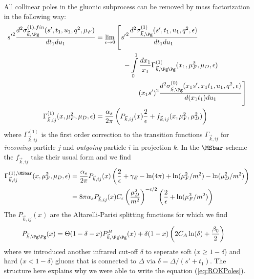 All collinear poles in the gluonic subprocess can be removed by mass factorization in the following way:
\begin{align}
{s'}^2\frac{d^2\sigma_{\vec k,\Pg}^{(1),fin}(s',t_1,u_1,q^2,\mu_F)}{dt_1du_1} &= \lim_{\epsilon\rightarrow 0}\left[{s'}^2\frac{d^2\sigma_{\vec k,\Pg}^{(1)}(s',t_1,u_1,q^2,\epsilon)}{dt_1du_1} \right.\nonumber\\
 &\hspace{40pt} -\int\limits_0^1\frac{dx_1}{x_1}\Gamma_{\vec k,\Pg\Pg}^{(1)}(x_1,\mu_F^2,\mu_D,\epsilon)\\
 &\hspace{60pt}\left.(x_1s')^2\frac{d^2\sigma_{\vec k,\Pg}^{(0)}(x_1s',x_1t_1,u_1,q^2,\epsilon)}{d(x_1t_1)du_1} \right]\\
\Gamma_{\vec k,ij}^{(1)}(x,\mu_F^2,\mu_D,\epsilon) &= \frac{\alpha_s}{2\pi}\left(P_{\vec k,ij}(x)\frac{2}{\epsilon} + f_{\vec k,ij}(x,\mu_F^2,\mu_D^2)\right)
\end{align}
where $\Gamma_{\vec k,ij}^{(1)}$ is the first order correction to the transition functions $\Gamma_{\vec k,ij}$ for \textit{incoming} particle $j$ and \textit{outgoing} particle $i$ in projection $k$. In the $\MSbar$-scheme the $f_{\vec k,ij}$ take their usual form and we find
\begin{align}
\Gamma_{\vec k,ij}^{(1),\MSbar}(x,\mu_F^2,\mu_D,\epsilon) &= \frac{\alpha_s}{2\pi}P_{\vec k,ij}(x)\left(\frac{2}{\epsilon} +\gamma_E - \ln(4\pi) + \ln(\mu_F^2/m^2) - \ln(\mu_D^2/m^2)\right)\\
 &= 8\pi\alpha_s P_{\vec k,ij}(x) C_\epsilon \left(\frac{\mu_D^2}{m^2}\right)^{-\epsilon/2} \left(\frac{2}{\epsilon} + \ln(\mu_F^2/m^2)\right)
\end{align}
The $P_{\vec k,ij}(x)$ are the Altarelli-Parisi splitting functions for which we find\cite{Altarelli:1977zs,Vogelsang:1995vh}
\begin{align}
P_{\vec k,\Pg\Pg}(x) &= \Theta(1-\delta-x)P_{\vec k,\Pg\Pg}^H(x)+\delta(1-x)\left(2C_A\ln(\delta)+\frac{\beta_0}{2}\right)
\end{align}
where we introduced another infrared cut-off $\delta$ to seperate soft ($x\geq 1-\delta$) and hard ($x<1-\delta$) gluons that is connected to $\Delta$ via $\delta=\Delta/(s'+t_1)$. The structure here explains why we were able to write the equation (\ref{eq:ROKPoles}).

